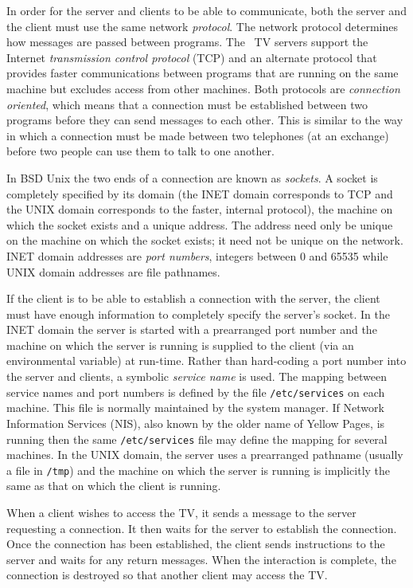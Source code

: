 In order for the server and clients to be able to communicate, both
the server and the client must use the same network {\it protocol\/}.
The network protocol determines how messages are passed between
programs.  The \AIPS\ TV servers support the Internet {\it
transmission control protocol\/} (TCP) and an alternate protocol that
provides faster communications between programs that are running on
the same machine but excludes access from other machines.
Both protocols are {\it connection oriented\/}, which means that a
connection must be established between two programs before they can
send messages to each other.  This is similar to the way in which a
connection must be made between two telephones (at an exchange) before
two people can use them to talk to one another.

In BSD Unix the two ends of a connection are known as {\it
sockets}.  A socket is completely specified by its domain (the INET
domain corresponds to TCP and the UNIX domain corresponds to the faster,
internal protocol), the machine on which the socket exists and a
unique address.  The address need only be unique on the machine on
which the socket exists; it need not be unique on the network.  INET
domain addresses are {\it port numbers}, integers between 0 and 65535
while UNIX domain addresses are file pathnames.

If the client is to be able to establish a connection with the
server, the client must have enough information to completely specify
the server's socket.  In the INET domain the server is started with a
prearranged port number and the machine on which the server is running
is supplied to the client (via an environmental variable) at run-time.
Rather than hard-coding a port number into the server and clients, a
symbolic {\it service name} is used.  The mapping between service
names and port numbers is defined by the file {\tt /etc/services} on
each machine.  This file is normally maintained by the system manager.
If Network Information Services (NIS), also known by the older name of
Yellow Pages, is running then the same {\tt /etc/services} file may define
the mapping for several machines.  In the UNIX domain, the server uses
a prearranged pathname (usually a file in {\tt /tmp}) and the machine
on which the server is running is implicitly the same as that on which
the client is running.

When a client wishes to access the TV, it sends a message to the
server requesting a connection.  It then waits for the server to
establish the connection.  Once the connection has been established, the
client sends instructions to the server and waits for any return
messages.  When the interaction is complete, the connection is
destroyed so that another client may access the \hbox{TV}.

